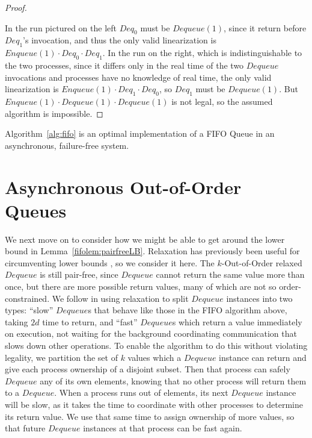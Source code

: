 \documentclass[a4paper,anonymous,USenglish]{lipics-v2021} %
\theoremstyle{definition}
\begin{document}
\begin{proof}
\begin{center}
  \end{center}
  In the run pictured on the left $Deq_0$ must be $Dequeue(1)$, since it return before $Deq_1$'s invocation, and thus the only valid linearization is $Enqueue(1) \cdot Deq_0 \cdot Deq_1$.  In the run on the right, which is indistinguishable to the two processes, since it differs only in the real time of the two $Dequeue$ invocations and processes have no knowledge of real time, the only valid linearization is $Enqueue(1) \cdot Deq_1 \cdot Deq_0$, so $Deq_1$ must be $Dequeue(1)$.  But $Enqueue(1) \cdot Dequeue(1) \cdot Dequeue(1)$ is not legal, so the assumed algorithm is impossible.  
\end{proof}

\begin{theorem}
  Algorithm~\ref{alg:fifo} is an optimal implementation of a FIFO Queue in an asynchronous, failure-free system.
\end{theorem}

  
\section{Asynchronous Out-of-Order Queues}

We next move on to consider how we might be able to get around the lower bound in Lemma~\ref{fifolem:pairfreeLB}.  Relaxation has previously been useful for circumventing lower bounds \cite{TalmageWelch14}, so we consider it here.  The $k$-Out-of-Order relaxed $Dequeue$ is still pair-free, since $Dequeue$ cannot return the same value more than once, but there are more possible return values, many of which are not so order-constrained.  We follow \cite{TalmageWelch14} in using relaxation to split $Dequeue$ instances into two types: ``slow'' $Dequeue$s that behave like those in the FIFO algorithm above, taking $2d$ time to return, and ``fast'' $Dequeue$s which return a value immediately on execution, not waiting for the background coordinating communication that slows down other operations.  To enable the algorithm to do this without violating legality, we partition the set of $k$ values which a $Dequeue$ instance can return and give each process ownership of a disjoint subset.  Then that process can safely $Dequeue$ any of its own elements, knowing that no other process will return them to a $Dequeue$.  When a process runs out of elements, its next $Dequeue$ instance will be slow, as it takes the time to coordinate with other processes to determine its return value.  We use that same time to assign ownership of more values, so that future $Dequeue$ instances at that process can be fast again.
\end{document}
